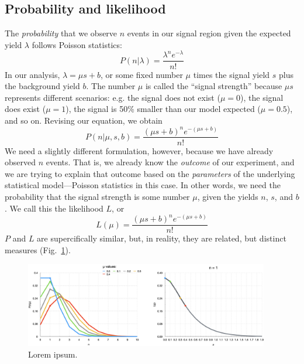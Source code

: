 \subsection{Probability and likelihood}
The \textit{probability} that we observe $n$ events in our signal region given the expected yield $\lambda$ follows Poisson statistics:
\begin{equation}
    P(n|\lambda) = \frac{\lambda^n e^{-\lambda}}{n!}
\end{equation}
In our analysis, $\lambda = \mu s + b$, or some fixed number $\mu$ times the signal yield $s$ plus the background yield $b$. 
The number $\mu$ is called the ``signal strength'' because $\mu s$ represents different scenarios: e.g. the signal does not exist ($\mu = 0$), the signal does exist ($\mu = 1$), the signal is 50\% smaller than our model expected ($\mu = 0.5$), and so on. 
Revising our equation, we obtain
\begin{equation}
    P(n|\mu, s, b) = \frac{(\mu s + b)^n e^{-(\mu s + b)}}{n!}
\end{equation}
We need a slightly different formulation, however, because we have already observed $n$ events. 
That is, we already know the \textit{outcome} of our experiment, and we are trying to explain that outcome based on the \textit{parameters} of the underlying statistical model---Poisson statistics in this case. 
In other words, we need the probability that the signal strength is some number $\mu$, given the yields $n$, $s$, and $b$. 
We call this the likelihood $L$, or
\begin{equation}
    L(\mu) = \frac{(\mu s + b)^n e^{-(\mu s + b)}}{n!}
\end{equation}
$P$ and $L$ are supercifically similar, but, in reality, they are related, but distinct measures (Fig.~\ref{fig:prob_vs_like}). 

\begin{figure}[htb]
    \centering
    \includegraphics[width=0.95\textwidth]{fig/stats/prob_vs_like.png}
    \caption{
        Lorem ipsum.
    }
    \label{fig:prob_vs_like}
\end{figure}

